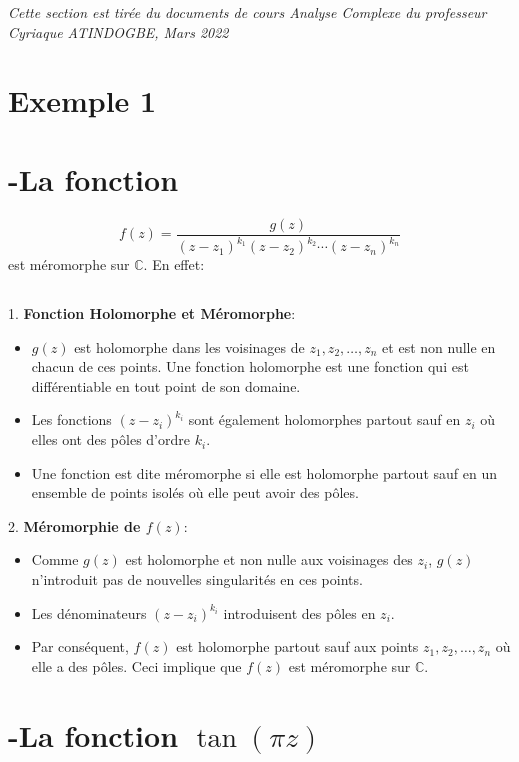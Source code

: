 \documentclass[12pt]{article}
\begin{document}
\textit{Cette section est tirée du documents de cours Analyse Complexe du professeur Cyriaque ATINDOGBE, Mars 2022}

\section*{Exemple 1 }
\section*{-La fonction}

\[ f(z) = \frac{g(z)}{(z - z_1)^{k_1} (z - z_2)^{k_2} \cdots (z - z_n)^{k_n}} \]
est méromorphe sur \( \mathbb{C} \). En effet:
\subsection*{}
1. \textbf{Fonction Holomorphe et Méromorphe}:
\begin{itemize}
	\item \( g(z) \) est holomorphe dans les voisinages de \( z_1, z_2, \ldots, z_n \) et est non nulle en chacun de ces points. Une fonction holomorphe est une fonction qui est différentiable en tout point de son domaine.
	\item Les fonctions \( (z - z_i)^{k_i} \) sont également holomorphes partout sauf en \( z_i \) où elles ont des pôles d'ordre \( k_i \).
	\item Une fonction est dite méromorphe si elle est holomorphe partout sauf en un ensemble de points isolés où elle peut avoir des pôles.
\end{itemize}

2. \textbf{Méromorphie de \( f(z) \)}:
\begin{itemize}
	\item Comme \( g(z) \) est holomorphe et non nulle aux voisinages des \( z_i \), \( g(z) \) n'introduit pas de nouvelles singularités en ces points.
	\item Les dénominateurs \( (z - z_i)^{k_i} \) introduisent des pôles en \( z_i \).
	\item Par conséquent, \( f(z) \) est holomorphe partout sauf aux points \( z_1, z_2, \ldots, z_n \) où elle a des pôles. Ceci implique que \( f(z) \) est méromorphe sur \( \mathbb{C} \).
\end{itemize}

\section*{-La fonction \(\tan(\pi z)\)}
\end{document}
